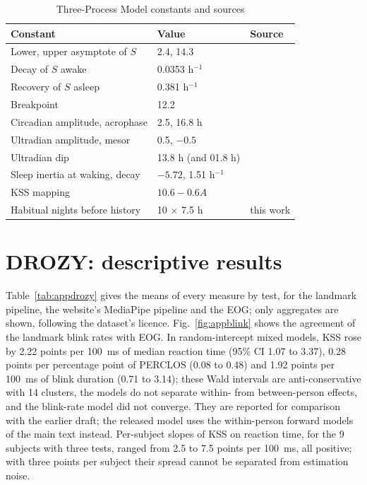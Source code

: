 \begin{table}[h]
  \centering
  \caption{Three-Process Model constants and sources}
  \label{tab:apptpm}
  \footnotesize
  \begin{tabular}{@{}lll@{}}
    \toprule
    Constant & Value & Source \\
    \midrule
    Lower, upper asymptote of $S$ & 2.4, 14.3 & \cite{akerstedt2004predictions,ingre2014validating} \\
    Decay of $S$ awake & 0.0353 h$^{-1}$ & \cite{akerstedt2004predictions,ingre2014validating} \\
    Recovery of $S$ asleep & 0.381 h$^{-1}$ & \cite{akerstedt2004predictions,ingre2014validating} \\
    Breakpoint & 12.2 & \cite{akerstedt2008accounting,ingre2014validating} \\
    Circadian amplitude, acrophase & 2.5, 16.8 h & \cite{akerstedt2004predictions,ingre2014validating} \\
    Ultradian amplitude, mesor & 0.5, $-0.5$ & \cite{ingre2014validating} \\
    Ultradian dip & 13.8 h (and 01.8 h) & \cite{akerstedt2004predictions} \\
    Sleep inertia at waking, decay & $-5.72$, 1.51 h$^{-1}$ & \cite{ingre2014validating} \\
    KSS mapping & $10.6 - 0.6A$ & \cite{ingre2014validating} \\
    Habitual nights before history & 10 $\times$ 7.5 h & this work \\
    \bottomrule
  \end{tabular}
\end{table}

\section{DROZY: descriptive results}
\label{app:drozy}
Table~\ref{tab:appdrozy} gives the means of every measure by test, for the landmark pipeline, the website's MediaPipe pipeline and the EOG; only aggregates are shown, following the dataset's licence. Fig.~\ref{fig:appblink} shows the agreement of the landmark blink rates with EOG. In random-intercept mixed models, KSS rose by 2.22 points per 100~ms of median reaction time (95\% CI 1.07 to 3.37), 0.28 points per percentage point of PERCLOS (0.08 to 0.48) and 1.92 points per 100~ms of blink duration (0.71 to 3.14); these Wald intervals are anti-conservative with 14 clusters, the models do not separate within- from between-person effects, and the blink-rate model did not converge. They are reported for comparison with the earlier draft; the released model uses the within-person forward models of the main text instead. Per-subject slopes of KSS on reaction time, for the 9 subjects with three tests, ranged from 2.5 to 7.5 points per 100~ms, all positive; with three points per subject their spread cannot be separated from estimation noise.

